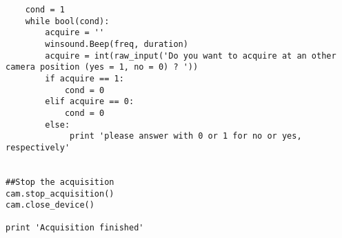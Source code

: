 \begin{lstlisting}
    cond = 1
    while bool(cond):
        acquire = ''
        winsound.Beep(freq, duration)
        acquire = int(raw_input('Do you want to acquire at an other camera position (yes = 1, no = 0) ? '))
        if acquire == 1:
            cond = 0
        elif acquire == 0:
            cond = 0
        else:
             print 'please answer with 0 or 1 for no or yes, respectively'


##Stop the acquisition
cam.stop_acquisition()
cam.close_device()

print 'Acquisition finished'

\end{lstlisting}
